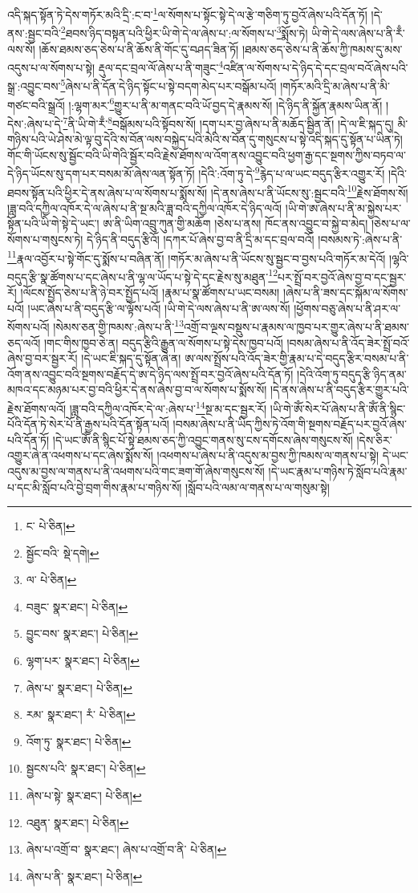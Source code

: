 འདི་སྐད་སྟོན་ཏེ་དེས་གཏོར་མའི་དྲི་:ང་བ་\footnote{ང་  པེ་ཅིན། }ལ་སོགས་པ་སྟོང་སྟེ་དེ་ལ་རྩེ་གཅིག་ཏུ་བྱའོ་ཞེས་པའི་དོན་ཏོ། །དེ་ནས་:སྦྱང་བའི་\footnote{སྦྱོང་བའི་  སྡེ་དགེ། }ཐབས་ཉིད་བསྟན་པའི་ཕྱིར་ཡི་གེ་དེ་ལ་ཞེས་པ་:ལ་སོགས་པ་\footnote{ལ་  པེ་ཅིན། }སྨོས་ཏེ། ཡི་གེ་དེ་ལས་ཞེས་པ་ནི་རྃ་ལས་སོ། །ཆོས་ཐམས་ཅད་ཅེས་པ་ནི་ཆོས་ནི་གོང་དུ་བཤད་ཟིན་ཏོ། །ཐམས་ཅད་ཅེས་པ་ནི་ཆོས་ཀྱི་ཁམས་དུ་མས་འདུས་པ་ལ་སོགས་པ་སྟེ། རྡུལ་དང་བྲལ་ལོ་ཞེས་པ་ནི་གཟུང་\footnote{བཟུང་  སྣར་ཐང་།  པེ་ཅིན། }འཛིན་ལ་སོགས་པ་དེ་ཉིད་དེ་དང་བྲལ་བའོ་ཞེས་པའི་སྒྲ་:འབྱུང་བས་\footnote{བྱུང་བས་  སྣར་ཐང་།  པེ་ཅིན། }ཞེས་པ་ནི་དོན་དེ་ཉིད་སྟོང་པ་སྟེ་བདག་མེད་པར་བསྒོམ་པའོ། །གཏོར་མའི་དྲི་མ་ཞེས་པ་ནི་མི་གཙང་བའི་སྒྲའོ། །:ལྷག་མར་\footnote{ལྷག་པར་  སྣར་ཐང་།  པེ་ཅིན། }གྱུར་པ་ནི་མ་གནང་བའི་ཡོ་བྱད་དེ་རྣམས་སོ། །དེ་ཉིད་ནི་སྐྱོན་རྣམས་ཡིན་ནོ། །དེས་:ཞེས་པ་དེ་\footnote{ཞེས་པ་  སྣར་ཐང་།  པེ་ཅིན། }ནི་ཡི་གེ་རྃ་\footnote{རམ་  སྣར་ཐང་། རཾ་  པེ་ཅིན། }བསྒོམས་པའི་སྟོབས་སོ། །དག་པར་བྱ་ཞེས་པ་ནི་མཆོད་སྦྱིན་ནོ། །དེ་ལ་ཇི་སྐད་དུ། མི་གཉིས་པའི་ཡེ་ཤེས་མེ་ལྟ་བུ་དེའི་ས་བོན་ལས་བསྐྱེད་པའི་མེའི་ས་བོན་དུ་གསུངས་པ་སྟེ་འདི་སྐད་དུ་སྟོན་པ་ཡིན་ཏེ། གོང་གི་ཡོངས་སུ་སྦྱོང་བའི་ཡི་གེའི་སྦྱོར་བའི་རྗེས་ཐོགས་ལ་འོག་ནས་འབྱུང་བའི་ཕྱག་རྒྱ་དང་སྔགས་ཀྱིས་བཏབ་ལ་དེ་ཉིད་ཡོངས་སུ་དག་པར་བསམ་མོ་ཞེས་ལན་སྟོན་ཏོ། །དེའི་:འོག་ཏུ་དེ་\footnote{འོག་ཏུ་  སྣར་ཐང་།  པེ་ཅིན། }རྙེད་པ་ལ་ཡང་བདུད་རྩིར་འགྱུར་རོ། །དེའི་ཐབས་སྟོན་པའི་ཕྱིར་དེ་ནས་ཞེས་པ་ལ་སོགས་པ་སྨོས་སོ། །དེ་ནས་ཞེས་པ་ནི་ཡོངས་སུ་:སྦྱང་བའི་\footnote{སྦྱངས་པའི་  སྣར་ཐང་།  པེ་ཅིན། }རྗེས་ཐོགས་སོ། །ཟླ་བའི་དཀྱིལ་འཁོར་དེ་ལ་ཞེས་པ་ནི་སྔ་མའི་ཟླ་བའི་དཀྱིལ་འཁོར་དེ་ཉིད་ལའོ། །ཡི་གེ་ཨ་ཞེས་པ་ནི་མ་སྐྱེས་པར་སྟོན་པའི་ཡི་གེ་སྟེ་དེ་ཡང་། ཨ་ནི་ཡིག་འབྲུ་ཀུན་གྱི་མཆོག །ཅེས་པ་ནས། ཁོང་ནས་འབྱུང་བ་སྐྱེ་བ་མེད། །ཅེས་པ་ལ་སོགས་པ་གསུངས་ཏེ། དེ་ཉིད་ནི་བདུད་རྩིའོ། །དཀར་པོ་ཞེས་བྱ་བ་ནི་དྲི་མ་དང་བྲལ་བའོ། །བསམས་ཏེ་:ཞེས་པ་ནི་\footnote{ཞེས་པ་སྟེ་  སྣར་ཐང་།  པེ་ཅིན། }རྣལ་འབྱོར་པ་སྟེ་གོང་དུ་སྨོས་པ་བཞིན་ནོ། །གཏོར་མ་ཞེས་པ་ནི་ཡོངས་སུ་སྦྱང་བ་བྱས་པའི་གཏོར་མ་དེའོ། །ལྷའི་བདུད་རྩི་སྣ་ཚོགས་པ་དང་ཞེས་པ་ནི་ལྷ་ལ་ཡོད་པ་སྟེ་དེ་དང་རྗེས་སུ་མཐུན་\footnote{འཐུན་  སྣར་ཐང་།  པེ་ཅིན། }པར་སྤྲོ་བར་བྱའོ་ཞེས་བྱ་བ་དང་སྦྱར་རོ། །ལོངས་སྤྱོད་ཅེས་པ་ནི་ཉེ་བར་སྤྱོད་པའོ། །རྣམ་པ་སྣ་ཚོགས་པ་ཡང་བསམ། །ཞེས་པ་ནི་ཟས་དང་སྐོམ་ལ་སོགས་པའོ། །ཡང་ཞེས་པ་ནི་བདུད་རྩི་ལ་ལྟོས་པའོ། །ཡི་གེ་དེ་ལས་ཞེས་པ་ནི་ཨ་ལས་སོ། །ཕྱོགས་བཅུ་ཞེས་པ་ནི་ཤར་ལ་སོགས་པའོ། །སེམས་ཅན་གྱི་ཁམས་:ཞེས་པ་ནི་\footnote{ཞེས་པ་འགྲོ་བ་  སྣར་ཐང་། ཞེས་པ་འགྲོ་བ་ནི་  པེ་ཅིན། }འགྲོ་བ་ལྔས་བསྡུས་པ་རྣམས་ལ་ཁྱབ་པར་གྱུར་ཞེས་པ་ནི་ཐམས་ཅད་ལའོ། །གང་གིས་ཁྱབ་ཅེ་ན། བདུད་རྩིའི་རྒྱུན་ལ་སོགས་པ་སྟེ་དེས་ཁྱབ་པའོ། །བསམ་ཞེས་པ་ནི་འོད་ཟེར་སྤྲོ་བའོ་ཞེས་བྱ་བར་སྦྱར་རོ། །དེ་ཡང་ཇི་སྐད་དུ་སྟོན་ཞེ་ན། ཨ་ལས་སྤྲོས་པའི་འོད་ཟེར་གྱི་རྣམ་པ་དེ་བདུད་རྩིར་བསམ་པ་ནི་འོག་ནས་འབྱུང་བའི་སྔགས་བརྗོད་དེ་ཨ་དེ་ཉིད་ལས་སྤྲོ་བར་བྱའོ་ཞེས་པའི་དོན་ཏོ། །དེའི་འོག་ཏུ་བདུད་རྩི་ཉིད་ནམ་མཁའ་དང་མཉམ་པར་བྱ་བའི་ཕྱིར་དེ་ནས་ཞེས་བྱ་བ་ལ་སོགས་པ་སྨོས་སོ། །དེ་ནས་ཞེས་པ་ནི་བདུད་རྩིར་གྱུར་པའི་རྗེས་ཐོགས་ལའོ། །ཟླ་བའི་དཀྱིལ་འཁོར་དེ་ལ་:ཞེས་པ་\footnote{ཞེས་པ་ནི་  སྣར་ཐང་།  པེ་ཅིན། }སྔ་མ་དང་སྦྱར་རོ། །ཡི་གེ་ཨོཾ་སེར་པོ་ཞེས་པ་ནི་ཨོཾ་ནི་སྙིང་པོའི་དོན་ཏེ་སེར་པོ་ནི་རྒྱས་པའི་དོན་སྟོན་པའོ། །བསམ་ཞེས་པ་ནི་ཡིད་ཀྱིས་ཏེ་འོག་གི་སྔགས་བརྗོད་པར་བྱའོ་ཞེས་པའི་དོན་ཏོ། །དེ་ཡང་ཨོཾ་ནི་སྙིང་པོ་སྟེ་ཐམས་ཅད་ཀྱི་འབྱུང་གནས་སུ་ངས་དགོངས་ཞེས་གསུངས་སོ། །དེས་ཅིར་འགྱུར་ཞེ་ན་འཕགས་པ་དང་ཞེས་སྨོས་སོ། །འཕགས་པ་ཞེས་པ་ནི་འདུས་མ་བྱས་ཀྱི་ཁམས་ལ་གནས་པ་སྟེ། དེ་ཡང་འདུས་མ་བྱས་ལ་གནས་པ་ནི་འཕགས་པའི་གང་ཟག་གོ་ཞེས་གསུངས་སོ། །དེ་ཡང་རྣམ་པ་གཉིས་ཏེ་སློབ་པའི་རྣམ་པ་དང་མི་སློབ་པའི་བྱེ་བྲག་གིས་རྣམ་པ་གཉིས་སོ། །སློབ་པའི་ལམ་ལ་གནས་པ་ལ་གསུམ་སྟེ། 